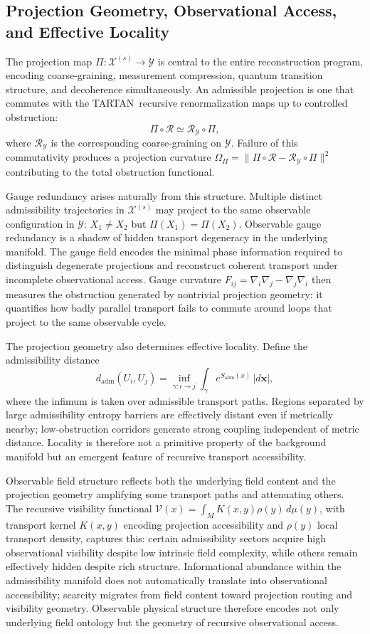 \documentclass[12pt,a4paper]{article}
\newcommand{\TARTAN}{\textrm{TARTAN}}
\newcommand{\Field}{\mathcal{X}}
\begin{document}
\subsection{Projection Geometry, Observational Access, and Effective Locality}

The projection map $\Pi:\Field^{(s)}\to\mathcal{Y}$ is central to the entire
reconstruction program, encoding coarse-graining, measurement compression,
quantum transition structure, and decoherence simultaneously. An admissible
projection is one that commutes with the \TARTAN\ recursive renormalization
maps up to controlled obstruction:
\[
\Pi\circ\mathcal{R} \simeq \mathcal{R}_\mathcal{Y}\circ\Pi,
\]
where $\mathcal{R}_\mathcal{Y}$ is the corresponding coarse-graining on
$\mathcal{Y}$. Failure of this commutativity produces a projection curvature
$\Omega_\Pi=\|\Pi\circ\mathcal{R}-\mathcal{R}_\mathcal{Y}\circ\Pi\|^2$
contributing to the total obstruction functional.

Gauge redundancy arises naturally from this structure. Multiple distinct
admissibility trajectories in $\Field^{(s)}$ may project to the same observable
configuration in $\mathcal{Y}$: $X_1\neq X_2$ but $\Pi(X_1)=\Pi(X_2)$.
Observable gauge redundancy is a shadow of hidden transport degeneracy in the
underlying manifold. The gauge field encodes the minimal phase information
required to distinguish degenerate projections and reconstruct coherent
transport under incomplete observational access. Gauge curvature
$F_{ij}=\nabla_i\nabla_j-\nabla_j\nabla_i$ then measures the obstruction
generated by nontrivial projection geometry: it quantifies how badly parallel
transport fails to commute around loops that project to the same observable
cycle.

The projection geometry also determines effective locality. Define the
admissibility distance
\[
d_\mathrm{adm}(U_i,U_j)
= \inf_{\gamma:i\to j}
\int_\gamma e^{S_\mathrm{adm}(x)}\,|d\mathbf{x}|,
\]
where the infimum is taken over admissible transport paths. Regions separated
by large admissibility entropy barriers are effectively distant even if
metrically nearby; low-obstruction corridors generate strong coupling
independent of metric distance. Locality is therefore not a primitive property
of the background manifold but an emergent feature of recursive transport
accessibility.

Observable field structure reflects both the underlying field content and the
projection geometry amplifying some transport paths and attenuating others.
The recursive visibility functional $\mathcal{V}(x)=\int_M K(x,y)\rho(y)\,d\mu(y)$,
with transport kernel $K(x,y)$ encoding projection accessibility and $\rho(y)$
local transport density, captures this: certain admissibility sectors acquire
high observational visibility despite low intrinsic field complexity, while
others remain effectively hidden despite rich structure. Informational abundance
within the admissibility manifold does not automatically translate into
observational accessibility; scarcity migrates from field content toward
projection routing and visibility geometry. Observable physical structure
therefore encodes not only underlying field ontology but the geometry of
recursive observational access.
\end{document}
